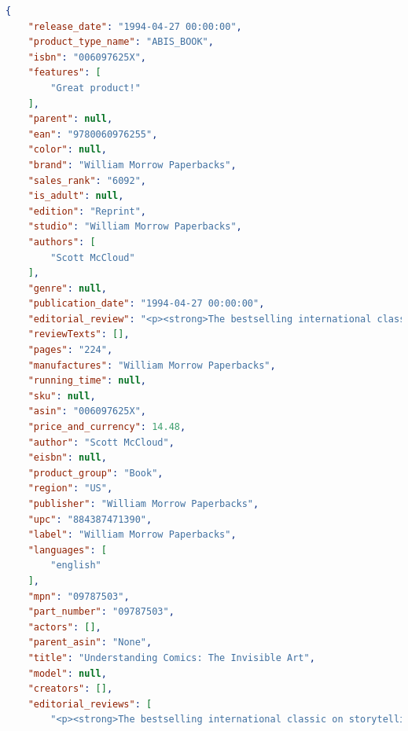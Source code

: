 \documentclass[LaM,oneside,binding=0.6cm]{sapthesis}
\begin{document}
\begin{lstlisting}[language=json,firstnumber=1]
{
    "release_date": "1994-04-27 00:00:00", 
    "product_type_name": "ABIS_BOOK", 
    "isbn": "006097625X", 
    "features": [
        "Great product!"
    ], 
    "parent": null, 
    "ean": "9780060976255", 
    "color": null, 
    "brand": "William Morrow Paperbacks", 
    "sales_rank": "6092", 
    "is_adult": null, 
    "edition": "Reprint", 
    "studio": "William Morrow Paperbacks", 
    "authors": [
        "Scott McCloud"
    ], 
    "genre": null, 
    "publication_date": "1994-04-27 00:00:00", 
    "editorial_review": "<p><strong>The bestselling international classic on storytelling and visual communication</strong></p><p><strong>\"You must read this book.\" </strong>\u2014<strong>\u00a0Neil Gaiman</strong></p><p>Praised throughout the cartoon industry by such luminaries as Art Spiegelman, Matt Groening, and Will Eisner,\u00a0Scott McCloud's <em>Understanding Comics</em>\u00a0is\u00a0a seminal examination of comics art: its rich\u00a0history, surprising\u00a0technical components, and major cultural significance.\u00a0Explore the secret world between the panels, through the lines, and within the hidden symbols of a powerful but misunderstood art form.</p>", 
    "reviewTexts": [], 
    "pages": "224", 
    "manufactures": "William Morrow Paperbacks", 
    "running_time": null, 
    "sku": null, 
    "asin": "006097625X", 
    "price_and_currency": 14.48, 
    "author": "Scott McCloud", 
    "eisbn": null, 
    "product_group": "Book", 
    "region": "US", 
    "publisher": "William Morrow Paperbacks", 
    "upc": "884387471390", 
    "label": "William Morrow Paperbacks", 
    "languages": [
        "english"
    ], 
    "mpn": "09787503", 
    "part_number": "09787503", 
    "actors": [], 
    "parent_asin": "None", 
    "title": "Understanding Comics: The Invisible Art", 
    "model": null, 
    "creators": [], 
    "editorial_reviews": [
        "<p><strong>The bestselling international classic on storytelling and visual communication</strong></p><p><strong>\"You must read this book.\" </strong>\u2014<strong>\u00a0Neil Gaiman</strong></p><p>Praised throughout the cartoon industry by such luminaries as Art Spiegelman, Matt Groening, and Will Eisner,\u00a0Scott McCloud's <em>Understanding Comics</em>\u00a0is\u00a0a seminal examination of comics art: its rich\u00a0history, surprising\u00a0technical components, and major cultural significance.\u00a0Explore the secret world between the panels, through the lines, and within the hidden symbols of a powerful but misunderstood art form.</p>", 

\end{lstlisting}
\end{document}
